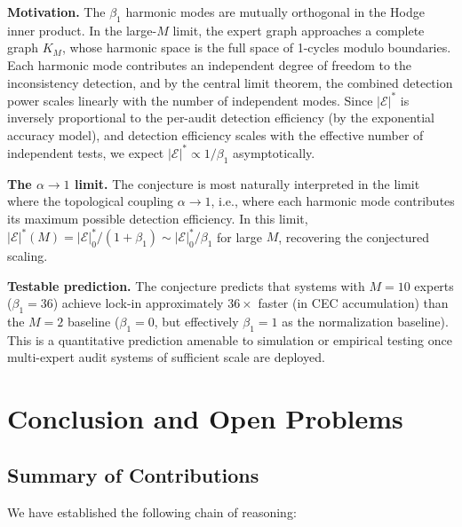 \documentclass[12pt,a4paper]{article}
\theoremstyle{definition}
\theoremstyle{remark}
\theoremstyle{definition}
\newcommand{\CEC}{\mathcal{E}}
\newcommand{\CECstar}{|\CEC|^*}
\begin{document}
\textbf{Motivation.} The $\beta_1$ harmonic modes are mutually orthogonal in the Hodge inner product. In the large-$M$ limit, the expert graph approaches a complete graph $K_M$, whose harmonic space is the full space of 1-cycles modulo boundaries. Each harmonic mode contributes an independent degree of freedom to the inconsistency detection, and by the central limit theorem, the combined detection power scales linearly with the number of independent modes. Since $\CECstar$ is inversely proportional to the per-audit detection efficiency (by the exponential accuracy model), and detection efficiency scales with the effective number of independent tests, we expect $\CECstar \propto 1/\beta_1$ asymptotically.

\textbf{The $\alpha \to 1$ limit.} The conjecture is most naturally interpreted in the limit where the topological coupling $\alpha \to 1$, i.e., where each harmonic mode contributes its maximum possible detection efficiency. In this limit, $\CECstar(M) = \CECstar_0/(1 + \beta_1) \sim \CECstar_0/\beta_1$ for large $M$, recovering the conjectured scaling.

\textbf{Testable prediction.} The conjecture predicts that systems with $M=10$ experts ($\beta_1=36$) achieve lock-in approximately $36\times$ faster (in CEC accumulation) than the $M=2$ baseline ($\beta_1=0$, but effectively $\beta_1 = 1$ as the normalization baseline). This is a quantitative prediction amenable to simulation or empirical testing once multi-expert audit systems of sufficient scale are deployed.

\section{Conclusion and Open Problems}

\subsection{Summary of Contributions}

We have established the following chain of reasoning:
\end{document}

